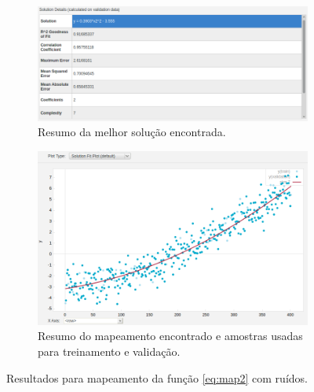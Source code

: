 \begin{figure}[h!]
		\begin{subfigure}{.5\textwidth}
		  \centering
		  \includegraphics[width=1\linewidth]{aproximacao/best_solucao_map2_r_info}
		  \caption{\centering Resumo da melhor solução encontrada.}
		  \label{fig:map2_best_c_ruido} 
		\end{subfigure} %
		\begin{subfigure}{.45\textwidth}
		  \centering
		  \includegraphics[width=1\linewidth]{aproximacao/best_solucao_map2_r}
		  \caption{\centering Resumo do mapeamento encontrado e amostras usadas para
		  treinamento e validação.}
		  \label{fig:map2_c_ruido} 
		\end{subfigure}
	
	\caption{Resultados para mapeamento da função \ref{eq:map2} com ruídos.}
	\end{figure}
	
	\FloatBarrier 
